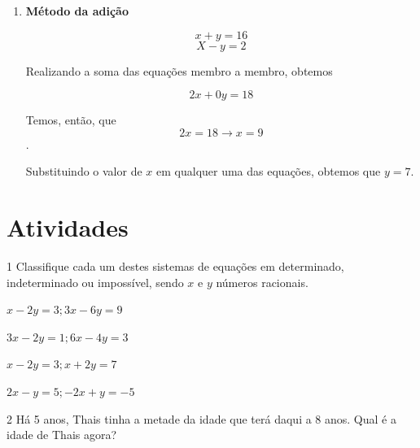 {\begin{enumerate}
Agora, substituiremos o valor de $x$ na segunda equação:

II) $$2x + 3y = 10$$
II) $$2 ( y -- 5) + 3y = 10$$
II) $$2y - 10 + 3y = 10$$
II) $$5y = 20$$
$$y = 4$$

Como sabemos o valor de $y$, agora basta substituir o valor de $y$ em
qualquer uma das duas equações para obtermos $x = -1$.

\item \textbf{Método da adição}

$$x + y = 16$$
$$X - y = 2$$

Realizando a soma das equações membro a membro, obtemos

$$2x + 0y = 18$$

Temos, então, que $$2x = 18 \rightarrow x = 9$$.

Substituindo o valor de $x$ em qualquer uma das equações, obtemos que $y =
7$.
\end{enumerate}
}



\section*{Atividades}

\num{1} Classifique cada um destes sistemas de equações em determinado,
indeterminado ou impossível, sendo $x$ e $y$ números racionais.

\begin{escolha}[itemsep=0pt]
\item $x - 2y = 3; 3x - 6y = 9$

\item $3x - 2y = 1; 6x - 4y = 3$

\item $x - 2y = 3; x + 2y = 7$

\item $2x - y = 5; -2x + y = -5$

\end{escolha}






\num{2} Há 5 anos, Thais tinha a metade da idade que terá daqui a 8 anos.
Qual é a idade de Thais agora?



